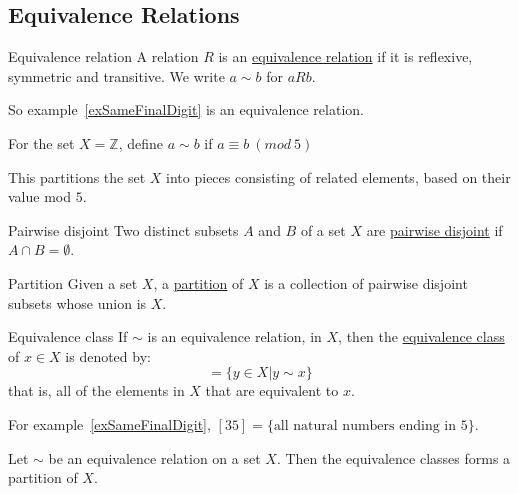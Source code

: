 \documentclass[../Main.tex]{subfiles}
\begin{document}
\subsection{Equivalence Relations}
\begin{definition}{Equivalence relation}
    A relation $R$ is an \underline{equivalence relation} if it is reflexive, symmetric and transitive. We write $a \sim b$ for $aRb$.
\end{definition}
So example~\ref{exSameFinalDigit} is an equivalence relation.
\begin{example}
    For the set $X = \mathbb{Z}$, define $a \sim b$ if $a \equiv b~(mod~5)$\par
    This partitions the set $X$ into pieces consisting of related elements, based on their value mod $5$.\par
\end{example}
\begin{definition}{Pairwise disjoint}
    Two distinct subsets $A$ and $B$ of a set $X$ are \underline{pairwise disjoint} if $A \cap B = \emptyset$.
\end{definition}
\begin{definition}{Partition}
    Given a set $X$, a \underline{partition} of $X$ is a collection of pairwise disjoint subsets whose union is $X$.
\end{definition}
\begin{definition}{Equivalence class}
    If $\sim$ is an equivalence relation, in $X$, then the \underline{equivalence class} of $x \in X$ is denoted by:
    \begin{equation*}
        [x] = \{y \in X | y \sim x\}
    \end{equation*}
    that is, all of the elements in $X$ that are equivalent to $x$.
\end{definition}
\begin{example}
    For example~\ref{exSameFinalDigit}, $[35] = \{\text{all natural numbers ending in 5}\}$.
\end{example}
\begin{theorem}
    Let $\sim$ be an equivalence relation on a set $X$. Then the equivalence classes forms a partition of $X$.
\end{theorem}
\end{document}
